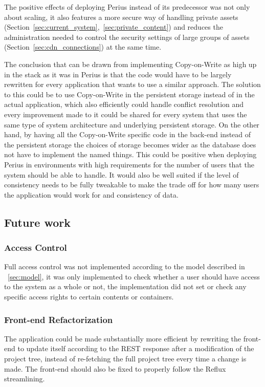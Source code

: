 \documentclass[a4paper,12pt]{article}
\begin{document}
\par The positive effects of deploying Perius instead of its predecessor was not only about
scaling, it also features a more secure way of handling private assets 
(Section~\ref{sec:current_system},~\ref{sec:private_content}) and reduces the
administration needed to control the security settings of large groups of assets
(Section~\ref{sec:cdn_connections}) at the same time.

\par The conclusion that can be drawn from implementing Copy-on-Write as high up in the stack as it
was in Perius is that the code would have to be largely rewritten for every application that wants
to use a similar approach. The solution to this could be to use Copy-on-Write in the persistent
storage instead of in the actual application, which also efficiently could handle conflict 
resolution and every improvement made to it could be shared for every system that uses the same 
type of system architecture and underlying persistent storage. On the other hand, by having all the
Copy-on-Write specific code in the back-end instead of the persistent storage the choices of
storage becomes wider as the database does not have to implement the named things. This could be
positive when deploying Perius in environments with high requirements for the number of users
that the system should be able to handle. It would also be well suited if the level of consistency
needs to be fully tweakable to make the trade off for how many users the application would work for
and consistency of data.

\subsection{Future work}
\subsubsection{Access Control}
Full access control was not implemented according to the model described in ~\ref{sec:model}, it
was only implemented to check whether a user should have access to the system as a whole or not, the
implementation did not set or check any specific access rights to certain contents or containers.

\subsubsection{Front-end Refactorization}
The application could be made substantially more efficient by rewriting the front-end to update
itself according to the REST response after a modification of the project tree, instead of 
re-fetching the full project tree every time a change is made. The front-end should also be fixed to
properly follow the Reflux streamlining.

\newpage


\end{document}
